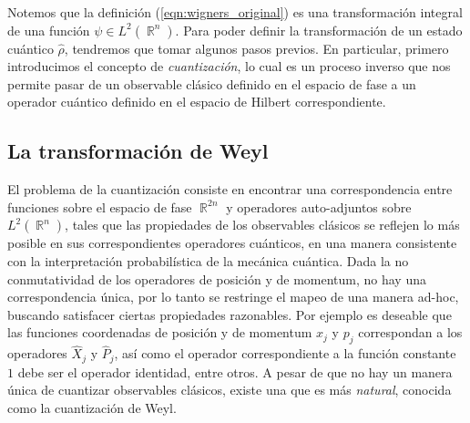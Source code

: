\documentclass[a4paper]{report}
\DeclareMathOperator{\R}{\mathbb{R}}
\begin{document}
  Notemos que la definición (\ref{eqn:wigners_original}) es
  una transformación integral de una función $\psi \in
  L^2(\R^{n})$. Para poder definir la transformación de un
  estado cuántico $\hat{\rho}$, tendremos que tomar algunos
  pasos previos. En particular, primero introducimos el
  concepto de \textit{cuantización}, lo cual es un proceso
  inverso que nos permite pasar de un observable clásico
  definido en el espacio de fase a un operador cuántico
  definido en el espacio de Hilbert correspondiente.

  \subsection{La transformación de Weyl}

  El problema de la cuantización consiste en encontrar una
  correspondencia entre funciones sobre el espacio de fase
  $\R^{2n}$ y operadores auto-adjuntos sobre $L^2(\R^{n})$,
  tales que las propiedades de los observables clásicos se
  reflejen lo más posible en sus correspondientes operadores
  cuánticos, en una manera consistente con la interpretación
  probabilística de la mecánica cuántica.  Dada la no
  conmutatividad de los operadores de posición y de
  momentum, no hay una correspondencia única, por lo tanto
  se restringe el mapeo de una manera ad-hoc, buscando
  satisfacer ciertas propiedades razonables. Por ejemplo es
  deseable que las funciones coordenadas de posición y de
  momentum $x_j$ y $p_j$ correspondan a los operadores
  $\hat{X}_j$ y $\hat{P}_j$, así como el operador
  correspondiente a la función constante $1$ debe ser el
  operador identidad, entre otros.  A pesar de que no hay un
  manera única de cuantizar observables clásicos, existe una
  que es más \textit{natural}, conocida como la cuantización
  de Weyl. 
\end{document}
